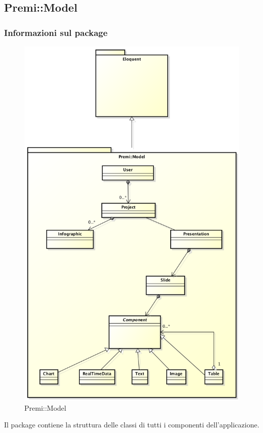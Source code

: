 \newpage
\subsection{Premi::Model}
	\subsubsection*{Informazioni sul package}
\begin{figure}[h]
\centering
\includegraphics[width=0.7\linewidth]{img/premi_http_model}
\caption[Premi::Model]{Premi::Model}
\label{fig:premi_http_model}
\end{figure}
		Il package contiene la struttura delle classi di tutti i componenti dell'applicazione.
	
